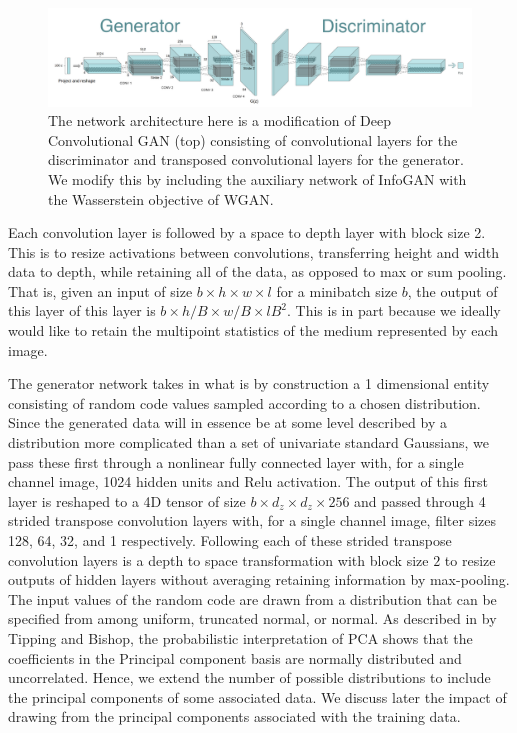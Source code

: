 \documentclass{article}
\begin{document}
\begin{figure}[h]
\centering
  \includegraphics[width=\linewidth,scale=0.2]{figures/1_39Nnni_nhPDaLu9AnTLoWw.png}
  \caption{The network architecture here is a modification of Deep Convolutional GAN (top) consisting of convolutional layers for the discriminator and transposed convolutional layers for the generator.  We modify this by including the auxiliary network of InfoGAN with the Wasserstein objective of WGAN.}
\end{figure}\label{nnet}

	Each convolution layer is followed by a space to depth layer with block size 2.  This is to resize activations between convolutions, transferring height and width data to depth, while retaining all of the data, as opposed to max or sum pooling. That is, given an input of size $ b\times h\times w\times l$ for a minibatch size $b$, the output of this layer of this layer is $b\times h/B \times w/B \times l B^2$.  This is in part because we ideally would like to retain the multipoint statistics of the medium represented by each image.  

	The generator network takes in what is by construction a 1 dimensional entity consisting of random code values sampled according to a chosen distribution.  Since the generated data will in essence be at some level described by a distribution more complicated than a set of univariate standard Gaussians, we pass these first through a nonlinear fully connected layer with, for a single channel image, 1024 hidden units and Relu activation.  The output of this first layer is reshaped to a 4D tensor of size $b\times d_z \times d_z \times 256$ and passed through 4 strided transpose convolution layers with, for a single channel image, filter sizes 128, 64, 32, and 1 respectively.  Following each of these  strided transpose convolution layers is a depth to space transformation with block size $2$ to resize outputs of hidden layers without averaging retaining information by max-pooling.  The input values of the random code are drawn from a distribution that can be specified from among uniform, truncated normal, or normal.  As described in \cite{Tipping1999ProbabilisticAnalysis} by Tipping and Bishop, the probabilistic interpretation of PCA shows that the coefficients in the Principal component basis are normally distributed and uncorrelated.  Hence, we extend the number of possible distributions to include the principal components of some associated data.  We discuss later the impact of drawing from the principal components associated with the training data.
\end{document}
